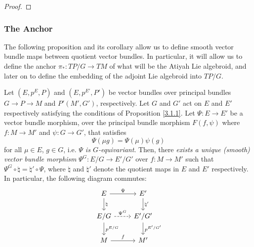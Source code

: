 \begin{proof}
\end{proof}

\subsubsection{The Anchor}

The following proposition and its corollary allow us to define smooth vector bundle maps between quotient vector bundles. In particular, it will allow us to define the anchor $\pi_*:TP/G \to TM$ of what will be the Atiyah Lie algebroid, and later on to define the embedding of the adjoint Lie algebroid into $TP/G$.

\begin{proposition} \label{3.1.2}
Let $(E, p^E, P)$ and $(E, p^{E'}, P')$ be vector bundles over principal bundles $G \to P \to M$ and $P'(M', G')$, respectively. Let $G$ and $G'$ act on $E$ and $E'$ respectively satisfying the conditions of Proposition \ref{3.1.1}. Let $\Psi: E \to E'$ be a vector bundle morphism, over the principal bundle morphism $F(f, \psi)$ where $f:M\to M'$ and $\psi:G \to G'$, that satisfies \[\Psi(\mu g) = \Psi(\mu) \psi(g)\] for all $\mu \in E$, $g \in G$, i.e. \emph{$\Psi$ is $G$-equivariant}. Then, there \emph{exists a unique (smooth) vector bundle morphism} $\Psi^{G}: E/G \to E'/G'$ over $f: M \to M'$ such that $\Psi^{G} \circ \natural = \natural' \circ \Psi$, where $\natural$ and $\natural'$ denote the quotient maps in $E$ and $E'$ respectively. In particular, the following diagram commutes:
\begin{equation} \label{diagramQuotientMorph}
\begin{tikzcd}
    E   \ar{r}{\Psi}     \ar{d}{\natural} &   E'  \ar{d}{\natural'} \\
    E/G \ar[dashed]{r}{\Psi^{G}} \ar{d}{p^{E/G}}  & E'/G' \ar{d}{p^{E'/G'}} \\
    M \ar{r}{f} & M'
\end{tikzcd}
\end{equation}
\end{proposition}

